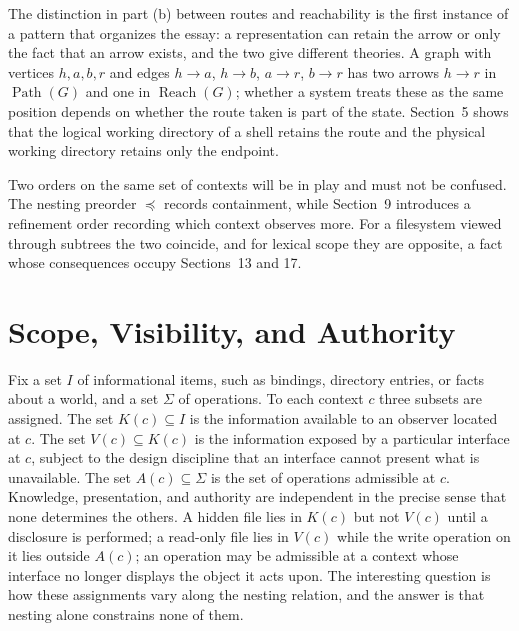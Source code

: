 \documentclass[11pt]{article}
\theoremstyle{definition}
\theoremstyle{remark}
\newcommand{\Path}{\operatorname{Path}}
\newcommand{\Reach}{\operatorname{Reach}}
\begin{document}
The distinction in part (b) between routes and reachability is the first instance of a pattern that organizes the essay: a representation can retain the arrow or only the fact that an arrow exists, and the two give different theories. A graph with vertices $h,a,b,r$ and edges $h\to a$, $h\to b$, $a\to r$, $b\to r$ has two arrows $h\to r$ in $\Path(G)$ and one in $\Reach(G)$; whether a system treats these as the same position depends on whether the route taken is part of the state. Section~5 shows that the logical working directory of a shell retains the route and the physical working directory retains only the endpoint.

Two orders on the same set of contexts will be in play and must not be confused. The nesting preorder $\preceq$ records containment, while Section~9 introduces a refinement order recording which context observes more. For a filesystem viewed through subtrees the two coincide, and for lexical scope they are opposite, a fact whose consequences occupy Sections~13 and 17.

\section{Scope, Visibility, and Authority}

Fix a set $I$ of informational items, such as bindings, directory entries, or facts about a world, and a set $\Sigma$ of operations. To each context $c$ three subsets are assigned. The set $K(c)\subseteq I$ is the information available to an observer located at $c$. The set $V(c)\subseteq K(c)$ is the information exposed by a particular interface at $c$, subject to the design discipline that an interface cannot present what is unavailable. The set $A(c)\subseteq\Sigma$ is the set of operations admissible at $c$. Knowledge, presentation, and authority are independent in the precise sense that none determines the others. A hidden file lies in $K(c)$ but not $V(c)$ until a disclosure is performed; a read-only file lies in $V(c)$ while the write operation on it lies outside $A(c)$; an operation may be admissible at a context whose interface no longer displays the object it acts upon. The interesting question is how these assignments vary along the nesting relation, and the answer is that nesting alone constrains none of them.
\end{document}
